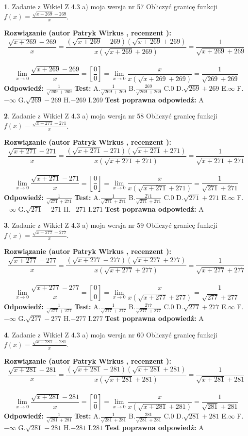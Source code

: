 \documentclass[12pt, a4paper]{article}
\theoremstyle{definition} %
\newtheorem{zad}{}
\newcommand{\zadStart}[1]{\begin{zad}#1\newline}
\newcommand{\zadStop}{\end{zad}}
\newcommand{\rozwStart}[2]{\noindent \textbf{Rozwiązanie (autor #1 , recenzent #2): }\newline}
\newcommand{\rozwStop}{\newline}
\newcommand{\odpStart}{\noindent \textbf{Odpowiedź:}\newline}
\newcommand{\odpStop}{\newline}
\newcommand{\testStart}{\noindent \textbf{Test:}\newline}
\newcommand{\testStop}{\newline}
\newcommand{\kluczStart}{\noindent \textbf{Test poprawna odpowiedź:}\newline}
\newcommand{\kluczStop}{\newline}
\begin{document}
\zadStart{Zadanie z Wikieł Z 4.3 a) moja wersja nr 57}
Obliczyć granicę funkcji $f(x)=\frac{\sqrt{x+269}-269}{x}$.
\zadStop
\rozwStart{Patryk Wirkus}{}
$$\frac{\sqrt{x+269}-269}{x}=\frac{(\sqrt{x+269}-269)(\sqrt{x+269}+269)}{x(\sqrt{x+269}+269)}=\frac{1}{\sqrt{x+269}+269}$$
\\
$$\lim\limits_{x\to0}\frac{\sqrt{x+269}-269}{x}=[\frac{0}{0}]=
\lim\limits_{x\to0}\frac{x}{x(\sqrt{x+269}+269)} = \frac{1}{\sqrt{269}+269}$$
\rozwStop
\odpStart
$\frac{1}{\sqrt{269}+269}$
\odpStop
\testStart
A.$\frac{1}{\sqrt{269}+269}$
B.$\frac{269}{\sqrt{269}+269}$
C.$0$
D.$\sqrt{269}+269$
E.$\infty$
F.$-\infty$
G.$\sqrt{269}-269$
H.$-269$
I.$269$
\testStop
\kluczStart
A
\kluczStop



\zadStart{Zadanie z Wikieł Z 4.3 a) moja wersja nr 58}
Obliczyć granicę funkcji $f(x)=\frac{\sqrt{x+271}-271}{x}$.
\zadStop
\rozwStart{Patryk Wirkus}{}
$$\frac{\sqrt{x+271}-271}{x}=\frac{(\sqrt{x+271}-271)(\sqrt{x+271}+271)}{x(\sqrt{x+271}+271)}=\frac{1}{\sqrt{x+271}+271}$$
\\
$$\lim\limits_{x\to0}\frac{\sqrt{x+271}-271}{x}=[\frac{0}{0}]=
\lim\limits_{x\to0}\frac{x}{x(\sqrt{x+271}+271)} = \frac{1}{\sqrt{271}+271}$$
\rozwStop
\odpStart
$\frac{1}{\sqrt{271}+271}$
\odpStop
\testStart
A.$\frac{1}{\sqrt{271}+271}$
B.$\frac{271}{\sqrt{271}+271}$
C.$0$
D.$\sqrt{271}+271$
E.$\infty$
F.$-\infty$
G.$\sqrt{271}-271$
H.$-271$
I.$271$
\testStop
\kluczStart
A
\kluczStop



\zadStart{Zadanie z Wikieł Z 4.3 a) moja wersja nr 59}
Obliczyć granicę funkcji $f(x)=\frac{\sqrt{x+277}-277}{x}$.
\zadStop
\rozwStart{Patryk Wirkus}{}
$$\frac{\sqrt{x+277}-277}{x}=\frac{(\sqrt{x+277}-277)(\sqrt{x+277}+277)}{x(\sqrt{x+277}+277)}=\frac{1}{\sqrt{x+277}+277}$$
\\
$$\lim\limits_{x\to0}\frac{\sqrt{x+277}-277}{x}=[\frac{0}{0}]=
\lim\limits_{x\to0}\frac{x}{x(\sqrt{x+277}+277)} = \frac{1}{\sqrt{277}+277}$$
\rozwStop
\odpStart
$\frac{1}{\sqrt{277}+277}$
\odpStop
\testStart
A.$\frac{1}{\sqrt{277}+277}$
B.$\frac{277}{\sqrt{277}+277}$
C.$0$
D.$\sqrt{277}+277$
E.$\infty$
F.$-\infty$
G.$\sqrt{277}-277$
H.$-277$
I.$277$
\testStop
\kluczStart
A
\kluczStop



\zadStart{Zadanie z Wikieł Z 4.3 a) moja wersja nr 60}
Obliczyć granicę funkcji $f(x)=\frac{\sqrt{x+281}-281}{x}$.
\zadStop
\rozwStart{Patryk Wirkus}{}
$$\frac{\sqrt{x+281}-281}{x}=\frac{(\sqrt{x+281}-281)(\sqrt{x+281}+281)}{x(\sqrt{x+281}+281)}=\frac{1}{\sqrt{x+281}+281}$$
\\
$$\lim\limits_{x\to0}\frac{\sqrt{x+281}-281}{x}=[\frac{0}{0}]=
\lim\limits_{x\to0}\frac{x}{x(\sqrt{x+281}+281)} = \frac{1}{\sqrt{281}+281}$$
\rozwStop
\odpStart
$\frac{1}{\sqrt{281}+281}$
\odpStop
\testStart
A.$\frac{1}{\sqrt{281}+281}$
B.$\frac{281}{\sqrt{281}+281}$
C.$0$
D.$\sqrt{281}+281$
E.$\infty$
F.$-\infty$
G.$\sqrt{281}-281$
H.$-281$
I.$281$
\testStop
\kluczStart
A
\kluczStop
\end{document}
